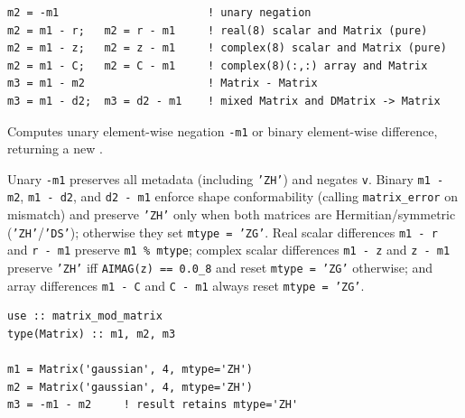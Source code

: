 \lstset{language=[95]Fortran}
\begin{lstlisting}
m2 = -m1                       ! unary negation
m2 = m1 - r;   m2 = r - m1     ! real(8) scalar and Matrix (pure)
m2 = m1 - z;   m2 = z - m1     ! complex(8) scalar and Matrix (pure)
m2 = m1 - C;   m2 = C - m1     ! complex(8)(:,:) array and Matrix
m3 = m1 - m2                   ! Matrix - Matrix
m3 = m1 - d2;  m3 = d2 - m1    ! mixed Matrix and DMatrix -> Matrix
\end{lstlisting}

Computes unary element-wise negation \texttt{-m1} or binary element-wise difference, returning a new .

Unary \texttt{-m1} preserves all metadata (including \texttt{'ZH'}) and negates \texttt{v}. Binary \texttt{m1 - m2}, \texttt{m1 - d2}, and \texttt{d2 - m1} enforce shape conformability (calling \texttt{matrix\_error} on mismatch) and preserve \texttt{'ZH'} only when both matrices are Hermitian/symmetric (\texttt{'ZH'}/\texttt{'DS'}); otherwise they set \texttt{mtype = 'ZG'}. Real scalar differences \texttt{m1 - r} and \texttt{r - m1} preserve \texttt{m1 \% mtype}; complex scalar differences \texttt{m1 - z} and \texttt{z - m1} preserve \texttt{'ZH'} iff \texttt{AIMAG(z) == 0.0\_8} and reset \texttt{mtype = 'ZG'} otherwise; and array differences \texttt{m1 - C} and \texttt{C - m1} always reset \texttt{mtype = 'ZG'}.

\begin{description}[leftmargin=2.2cm, style=nextline]
\end{description}

\lstset{language=[95]Fortran}
\begin{lstlisting}
use :: matrix_mod_matrix
type(Matrix) :: m1, m2, m3

m1 = Matrix('gaussian', 4, mtype='ZH')
m2 = Matrix('gaussian', 4, mtype='ZH')
m3 = -m1 - m2     ! result retains mtype='ZH'
\end{lstlisting}


